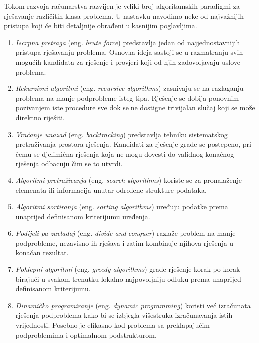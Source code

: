 Tokom razvoja računarstva razvijen je veliki broj algoritamskih paradigmi za rješavanje različitih klasa problema. U nastavku navodimo neke od najvažnijih pristupa koji će biti detaljnije obrađeni u kasnijim poglavljima.

\begin{enumerate}
	\item \textit{Iscrpna pretraga} (eng. \emph{brute force}) predstavlja jedan od najjednostavnijih pristupa rješavanju problema. Osnovna ideja sastoji se u razmatranju svih mogućih kandidata za rješenje i provjeri koji od njih zadovoljavaju uslove problema.
	
	\item \textit{Rekurzivni algoritmi} (eng. \textit{recursive algorithms}) zasnivaju se na razlaganju problema na manje podprobleme istog tipa. Rješenje se dobija ponovnim pozivanjem iste procedure sve dok se ne dostigne trivijalan slučaj koji se može direktno riješiti.
	
	\item \textit{Vraćanje unazad} (eng. \emph{backtracking}) predstavlja tehniku sistematskog pretraživanja prostora rješenja. Kandidati za rješenje grade se postepeno, pri čemu se djelimična rješenja koja ne mogu dovesti do validnog konačnog rješenja odbacuju čim se to utvrdi.
	
	\item \textit{Algoritmi pretraživanja} (eng. \textit{search algorithms}) koriste se za pronalaženje elemenata ili informacija unutar određene strukture podataka.
	
	\item \textit{Algoritmi sortiranja} (eng. \textit{sorting algorithms}) uređuju podatke prema unaprijed definisanom kriterijumu uređenja.
	
	\item \textit{Podijeli pa zavladaj} (eng. \emph{divide-and-conquer}) razlaže problem na manje podprobleme, nezavisno ih rješava i zatim kombinuje njihova rješenja u konačan rezultat.
	
	\item \textit{Pohlepni algoritmi} (eng. \textit{greedy algorithms}) grade rješenje korak po korak birajući u svakom trenutku lokalno najpovoljniju odluku prema unaprijed definisanom kriterijumu.
	
	\item \textit{Dinamičko programiranje} (eng. \textit{dynamic programming}) koristi već izračunata rješenja podproblema kako bi se izbjegla višestruka izračunavanja istih vrijednosti. Posebno je efikasno kod problema sa preklapajućim podproblemima i optimalnom podstrukturom.
\end{enumerate}

